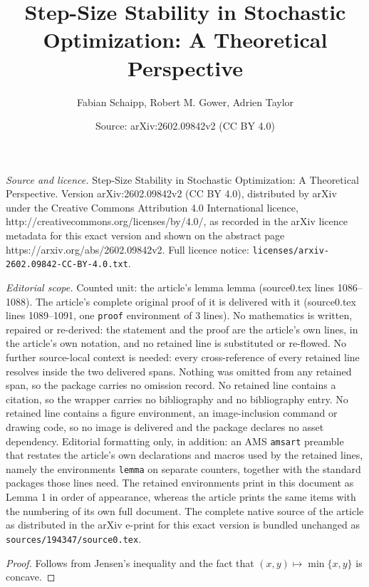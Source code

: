 \documentclass[10pt,a4paper]{amsart}
\title{Step-Size Stability in Stochastic Optimization: A Theoretical Perspective}
\author{Fabian Schaipp, Robert M. Gower, Adrien Taylor}
\date{Source: arXiv:2602.09842v2 (CC BY 4.0)}
\newtheorem{lemma}{Lemma}
\newcommand{\E}{\mathbb{E}}
\begin{document}
\maketitle

\noindent\emph{Source and licence.} Step-Size Stability in Stochastic Optimization: A Theoretical Perspective. Version arXiv:2602.09842v2 (CC BY 4.0), distributed by arXiv under the Creative Commons Attribution 4.0 International licence, http://creativecommons.org/licenses/by/4.0/, as recorded in the arXiv licence metadata for this exact version and shown on the abstract page https://arxiv.org/abs/2602.09842v2. Full licence notice: \texttt{licenses/arxiv-2602.09842-CC-BY-4.0.txt}.\par\smallskip

\noindent\textit{Editorial scope.} Counted unit: the article's lemma lemma (source0.tex lines 1086--1088). The article's complete original proof of it is delivered with it (source0.tex lines 1089--1091, one \texttt{proof} environment of 3 lines). No mathematics is written, repaired or re-derived: the statement and the proof are the article's own lines, in the article's own notation, and no retained line is substituted or re-flowed.  No further source-local context is needed: every cross-reference of every retained line resolves inside the two delivered spans.  Nothing was omitted from any retained span, so the package carries no omission record.  No retained line contains a citation, so the wrapper carries no bibliography and no bibliography entry.  No retained line contains a figure environment, an image-inclusion command or drawing code, so no image is delivered and the package declares no asset dependency.  Editorial formatting only, in addition: an AMS \texttt{amsart} preamble that restates the article's own declarations and macros used by the retained lines, namely the environments \texttt{lemma} on separate counters, together with the standard packages those lines need.  The retained environments print in this document as Lemma 1 in order of appearance, whereas the article prints the same items with the numbering of its own full document.  The complete native source of the article as distributed in the arXiv e-print for this exact version is bundled unchanged as \texttt{sources/194347/source0.tex}.

\begin{proof}
    Follows from Jensen's inequality and the fact that $(x,y)\mapsto \min\{x,y\}$ is concave.
\end{proof}
\end{document}
